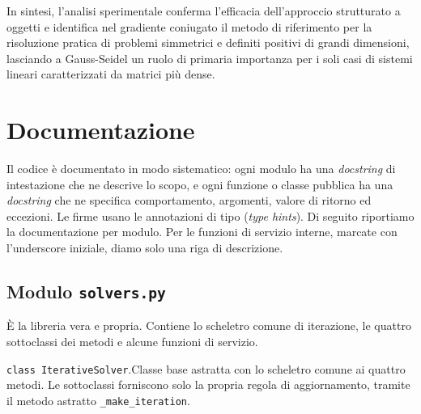 \documentclass[11pt,a4paper]{article}
\begin{document}
In sintesi, l'analisi sperimentale conferma l'efficacia dell'approccio strutturato a oggetti e identifica nel gradiente coniugato il metodo di riferimento per la risoluzione pratica di problemi simmetrici e definiti positivi di grandi dimensioni, lasciando a Gauss-Seidel un ruolo di primaria importanza per i soli casi di sistemi lineari caratterizzati da matrici più dense.

\section{Documentazione}\label{sec:documentazione}
Il codice è documentato in modo sistematico: ogni modulo ha una \emph{docstring}
di intestazione che ne descrive lo scopo, e ogni funzione o classe pubblica ha
una \emph{docstring} che ne specifica comportamento, argomenti, valore di ritorno
ed eccezioni. Le firme usano le annotazioni di tipo (\emph{type hints}). Di
seguito riportiamo la documentazione per modulo. Per le funzioni di servizio
interne, marcate con l'underscore iniziale, diamo solo una riga di descrizione.

\newcommand{\fundoc}[2]{\par\medskip\noindent\texttt{#1}.\quad #2}
\newenvironment{ioe}{\begin{itemize}[leftmargin=1.6em,topsep=2pt,itemsep=1pt,parsep=0pt]}{\end{itemize}}

\subsection{Modulo \texttt{solvers.py}}
È la libreria vera e propria. Contiene lo scheletro comune di iterazione, le
quattro sottoclassi dei metodi e alcune funzioni di servizio.

\fundoc{class IterativeSolver}{Classe base astratta con lo scheletro comune ai
quattro metodi. Le sottoclassi forniscono solo la propria regola di
aggiornamento, tramite il metodo astratto \texttt{\_make\_iteration}.}
\end{document}
